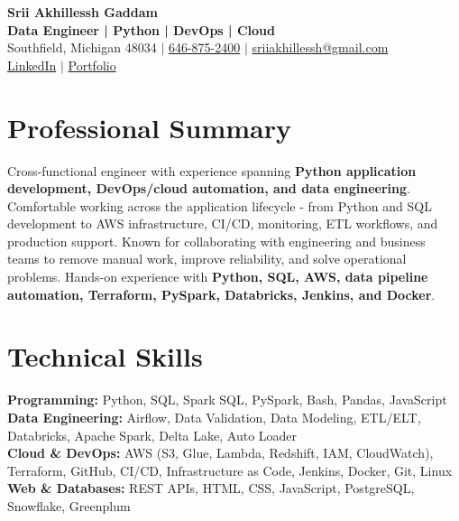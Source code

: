 \documentclass[letterpaper,10pt]{article}
\begin{document}
\fontsize{9.35pt}{10.45pt}\selectfont

\begin{center}
    {\LARGE \textbf{Srii Akhillessh Gaddam}} \\[-1pt]
    \textbf{Data Engineer | Python | DevOps | Cloud} \\[2pt]
    Southfield, Michigan 48034 $|$
    \href{tel:6468752400}{646-875-2400} $|$
    \href{mailto:sriiakhillessh@gmail.com}{sriiakhillessh@gmail.com} \\[1pt]
    \href{https://www.linkedin.com/in/srii-akhiilessh-gaddam-b48668191/}{LinkedIn} $|$
    \href{https://sriiakhillesshg.github.io/portfolio/}{Portfolio}
\end{center}
\vspace{-8pt}

\section{Professional Summary}
\small{Cross-functional engineer with experience spanning \textbf{Python application development, DevOps/cloud automation, and data engineering}. Comfortable working across the application lifecycle - from Python and SQL development to AWS infrastructure, CI/CD, monitoring, ETL workflows, and production support. Known for collaborating with engineering and business teams to remove manual work, improve reliability, and solve operational problems. Hands-on experience with \textbf{Python, SQL, AWS, data pipeline automation, Terraform, PySpark, Databricks, Jenkins, and Docker}.}

\section{Technical Skills}
\small{
\textbf{Programming:} Python, SQL, Spark SQL, PySpark, Bash, Pandas, JavaScript \\
\textbf{Data Engineering:} Airflow, Data Validation, Data Modeling, ETL/ELT, Databricks, Apache Spark, Delta Lake, Auto Loader \\
\textbf{Cloud \& DevOps:} AWS (S3, Glue, Lambda, Redshift, IAM, CloudWatch), Terraform, GitHub, CI/CD, Infrastructure as Code, Jenkins, Docker, Git, Linux \\
\textbf{Web \& Databases:} REST APIs, HTML, CSS, JavaScript, PostgreSQL, Snowflake, Greenplum
}
\end{document}
